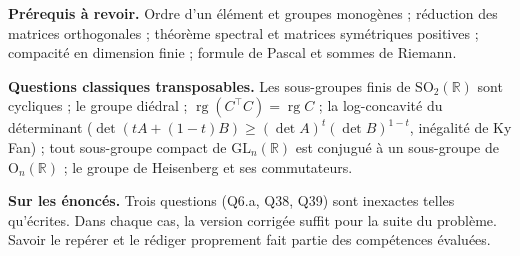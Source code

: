 \documentclass[11pt,a4paper]{article}
\begin{document}
\textbf{Prérequis à revoir.} Ordre d'un élément et groupes monogènes ; réduction des matrices orthogonales ; théorème spectral et matrices symétriques positives ; compacité en dimension finie ; formule de Pascal et sommes de Riemann.

\textbf{Questions classiques transposables.} Les sous-groupes finis de \({\mathrm{SO}}_2(\mathbb{R})\) sont cycliques ; le groupe diédral ; \(\operatorname{rg}(C^\top C)=\operatorname{rg}C\) ; la log-concavité du déterminant (\(\det(tA+(1-t)B)\geqslant(\det A)^t(\det B)^{1-t}\), inégalité de Ky Fan) ; tout sous-groupe compact de \({\mathrm{GL}}_n(\mathbb{R})\) est conjugué à un sous-groupe de \({\mathrm{O}}_n(\mathbb{R})\) ; le groupe de Heisenberg et ses commutateurs.

\textbf{Sur les énoncés.} Trois questions (Q6.a, Q38, Q39) sont inexactes telles qu'écrites. Dans chaque cas, la version corrigée suffit pour la suite du problème. Savoir le repérer et le rédiger proprement fait partie des compétences évaluées.
\end{document}
